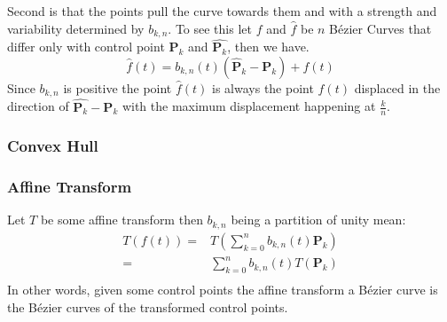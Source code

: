 Second is that the points pull the curve towards them and with a strength and variability determined by $b_{k,n}$.
To see this let $f$ and $\hat{f}$ be $n$ Bézier Curves that differ only with control point $\mathbf{P}_k$ and $\hat{\mathbf{P}_k}$, then we have.
\[
	\hat{f}(t) = b_{k,n}(t)(\hat{\mathbf{P}}_k-\mathbf{P}_k)+f(t)
\]
Since $b_{k,n}$ is positive the point $\hat{f}(t)$ is always the point $f(t)$ displaced in the direction of $\hat{\mathbf{P}_k}-\mathbf{P}_k$ with the maximum displacement happening at $\frac{k}{n}$.

\subsubsection{Convex Hull}

\subsubsection{Affine Transform}
Let $T$ be some affine transform then $b_{k,n}$ being a partition of unity mean:
\[\begin{aligned}
	T(f(t)) =& T\left(\sum_{k=0}^nb_{k,n}(t)\mathbf{P}_k\right)\\
	=& \sum_{k=0}^nb_{k,n}(t)T(\mathbf{P}_k)\\
\end{aligned}\]
In other words,
given some control points the affine transform a Bézier curve is the Bézier curves of the transformed control points.

